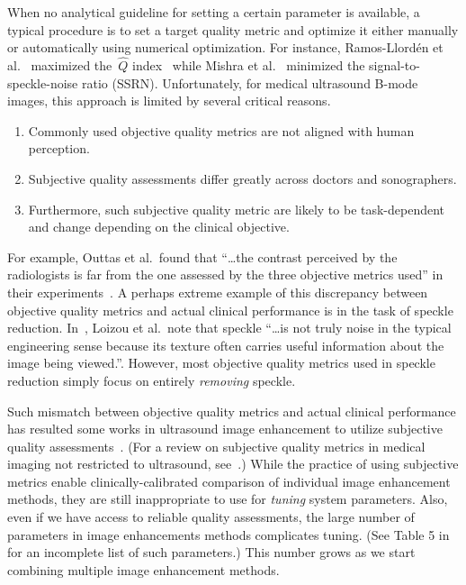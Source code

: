 When no analytical guideline for setting a certain parameter is available, a typical procedure is to set a target quality metric and optimize it either manually or automatically using numerical optimization.
For instance, Ramos-Llord\'en et al.~\cite{ramos-llorden_anisotropic_2015} maximized the~\(\widehat{Q}\) index~\cite{tay_ultrasound_2006} while Mishra et al.~\cite{mishra_edge_2018} minimized the signal-to-speckle-noise ratio (SSRN).
Unfortunately, for medical ultrasound B-mode images, this approach is limited by several critical reasons.
\vspace{0.05in}
\begin{enumerate}
  \item[\ding{228}] Commonly used objective quality metrics are not aligned with human perception.
    \vspace{0.05in}
  \item[\ding{228}] Subjective quality assessments differ greatly across doctors and sonographers.
    \vspace{0.05in}
  \item[\ding{228}] Furthermore, such subjective quality metric are likely to be task-dependent and change depending on the clinical objective.
\end{enumerate}
For example, Outtas et al.~found that ``\ldots the contrast perceived by the radiologists is far from the one assessed by the three objective metrics used'' in their experiments~\cite{outtas_subjective_2018}.
A perhaps extreme example of this discrepancy between objective quality metrics and actual clinical performance is in the task of speckle reduction.
In~\cite{loizou_comparative_2005}, Loizou et al.~note that speckle ``\ldots is not truly noise in the typical engineering sense because its texture often carries useful information about the image being viewed.''.
However, most objective quality metrics used in speckle reduction simply focus on entirely \textit{removing} speckle.

Such mismatch between objective quality metrics and actual clinical performance has resulted some works in ultrasound image enhancement to utilize subjective quality assessments~\cite{loizou_quality_2006, hemmsen_ultrasound_2010, wong_monte_2012, kang_new_2016, mishra_edge_2018}.
(For a review on subjective quality metrics in medical imaging not restricted to ultrasound, see~\cite{chow_review_2016}.)
While the practice of using subjective metrics enable clinically-calibrated comparison of individual image enhancement methods, they are still inappropriate to use for \textit{tuning} system parameters.
Also, even if we have access to reliable quality assessments, the large number of parameters in image enhancements methods complicates tuning.
(See Table 5 in~\cite{finn_echocardiographic_2011} for an incomplete list of such parameters.)
This number grows as we start combining multiple image enhancement methods.


